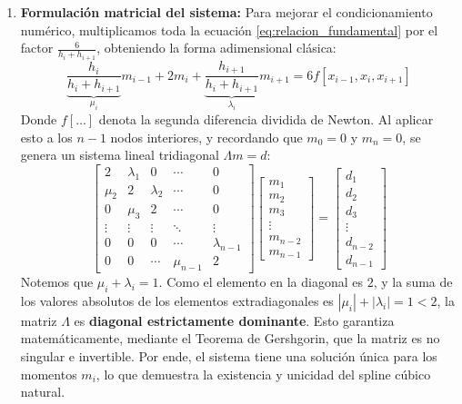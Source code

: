 \begin{enumerate}
    \item \textbf{Formulación matricial del sistema:}
    Para mejorar el condicionamiento numérico, multiplicamos toda la ecuación \eqref{eq:relacion_fundamental} por el factor $\frac{6}{h_i + h_{i+1}}$, obteniendo la forma adimensional clásica:
    \[
        \underbrace{\frac{h_i}{h_i + h_{i+1}}}_{\mu_i} m_{i-1} + 2 m_i + 
        \underbrace{\frac{h_{i+1}}{h_i + h_{i+1}}}_{\lambda_i} m_{i+1} = 
        6 f[x_{i-1}, x_i, x_{i+1}]
    \]
    Donde $f[\dots]$ denota la segunda diferencia dividida de Newton. Al aplicar esto a los $n-1$ nodos interiores, y recordando que $m_0 = 0$ y $m_n = 0$, se genera un sistema lineal tridiagonal $\Lambda m = d$:
    \[
        \begin{bmatrix}
            2 & \lambda_1 & 0 & \cdots & 0 \\
            \mu_2 & 2 & \lambda_2 & \cdots & 0 \\
            0 & \mu_3 & 2 & \cdots & 0 \\
            \vdots & \vdots & \vdots & \ddots & \vdots \\
            0 & 0 & 0 & \cdots & \lambda_{n-1} \\
            0 & 0 & \cdots & \mu_{n-1} & 2
        \end{bmatrix}
        \begin{bmatrix}
            m_1 \\
            m_2 \\
            m_3 \\
            \vdots \\
            m_{n-2} \\
            m_{n-1}
        \end{bmatrix}
        = 
        \begin{bmatrix}
            d_1 \\
            d_2 \\
            d_3 \\
            \vdots \\
            d_{n-2} \\
            d_{n-1}
        \end{bmatrix}
    \]
    Notemos que $\mu_i + \lambda_i = 1$. Como el elemento en la diagonal es $2$, y la suma de los valores absolutos de los elementos extradiagonales es $|\mu_i| + |\lambda_i| = 1 < 2$, la matriz $\Lambda$ es \textbf{diagonal estrictamente dominante}. Esto garantiza matemáticamente, mediante el Teorema de Gershgorin, que la matriz es no singular e invertible. Por ende, el sistema tiene una solución única para los momentos $m_i$, lo que demuestra la existencia y unicidad del spline cúbico natural.
\end{enumerate}

